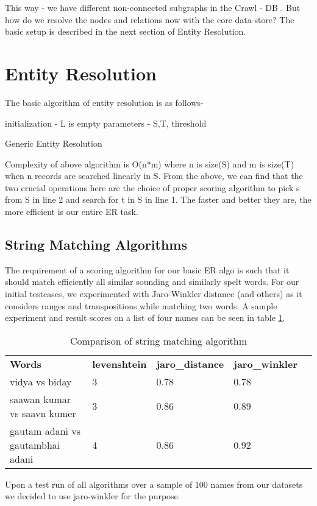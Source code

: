 This way - we have different non-connected subgraphs in the Crawl - DB .  
But how do we resolve the nodes and relations now with the core data-store? The basic setup is described in the next section of Entity Resolution. 

\section{Entity Resolution}
\label{dataer}

The basic algorithm of entity resolution is as follows-

\begin{algorithm}[H]
initialization - L is empty \;
parameters - S,T, threshold \;
 \caption{Generic Entity Resolution}
\end{algorithm}

Complexity of above algorithm is O(n*m) where n is size(S) and m is size(T) when n records are searched linearly in S.
        From the above, we can find that the two crucial operations here are the choice of proper scoring algorithm to pick s from S in line 2 and search for t in S in line 1. The faster and better they are, the more efficient is our entire ER task.

\subsection{String Matching Algorithms}
        The requirement of a scoring algorithm for our basic ER algo is such that it should match efficiently all similar sounding and similarly spelt words. For our initial testcases, we experimented with Jaro-Winkler distance (and others) as it considers ranges and transpositions while matching two words. A sample experiment and result scores on a list of four names can be seen in table \ref{table:1}.

    \begin{table}[H]
    \centering
    \caption{Comparison of string matching algorithm}
    \label{table:1}
    \begin{tabular}{|l|l|l|l|l}
    \cline{1-4}
    \textbf{Words}                   & \textbf{levenshtein} & \textbf{jaro\_distance} & \textbf{jaro\_winkler} &  \\ \cline{1-4}
    vidya vs biday                   & 3                    & 0.78                    & 0.78                   &  \\ \cline{1-4}
    saawan kumar vs saavn kumer      & 3                    & 0.86                    & 0.89                   &  \\ \cline{1-4}
    gautam adani vs gautambhai adani & 4                    & 0.86                    & 0.92                   &  \\ \cline{1-4}
    \end{tabular}
    \end{table}
        Upon a test run of all algorithms over a sample of 100 names from our datasets we decided to use jaro-winkler for the purpose. 

